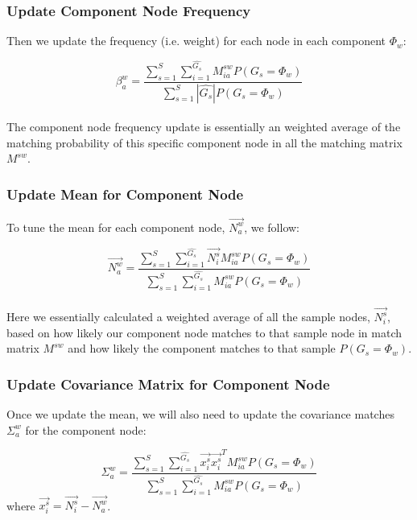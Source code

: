 \subsubsection{Update Component Node Frequency}

Then we update the frequency (i.e. weight) for each node in each component $\Phi_w$:

\begin{equation} 
\beta^w_a=\frac{\sum^S_{s=1}\sum^{\widehat{G_s}}_{i=1}M^{sw}_{ia}P(G_s=\Phi_w)}{\sum^S_{s=1}|\widehat{G_s}|P(G_s=\Phi_w)}
\end{equation}\\

The component node frequency update is essentially an weighted average of the matching probability of this specific component node in all the matching matrix $M^{sw}$.\\

\subsubsection{Update Mean for Component Node}

To tune the mean for each component node, $\overrightarrow{N^w_a}$, we follow:

\begin{equation} 
\overrightarrow{N^w_a}=\frac{\sum^S_{s=1}\sum^{\widehat{G_s}}_{i=1}\overrightarrow{N^s_i}M^{sw}_{ia}P(G_s=\Phi_w)}{\sum^S_{s=1}\sum^{\widehat{G_s}}_{i=1}M^{sw}_{ia}P(G_s=\Phi_w)} \label{eq:nmean}
\end{equation}\\

Here we essentially calculated a weighted average of all the sample nodes, $\overrightarrow{N^s_i}$, based on how likely our component node matches to that sample node in match matrix $M^{sw}$ and how likely the component matches to that sample $P(G_s=\Phi_w)$.\\

\subsubsection{Update Covariance Matrix for Component Node}

Once we update the mean, we will also need to update the covariance matches $\Sigma^w_a$ for the component node:

\begin{equation} 
\Sigma^w_a=\frac{\sum^S_{s=1}\sum^{\widehat{G_s}}_{i=1}\overrightarrow{x^s_i}\overrightarrow{x^s_i}^TM^{sw}_{ia}P(G_s=\Phi_w)}{\sum^S_{s=1}\sum^{\widehat{G_s}}_{i=1}M^{sw}_{ia}P(G_s=\Phi_w)}
\end{equation}
where $\overrightarrow{x^s_i} = \overrightarrow{N^s_i} - \overrightarrow{N^w_a}$.\\

